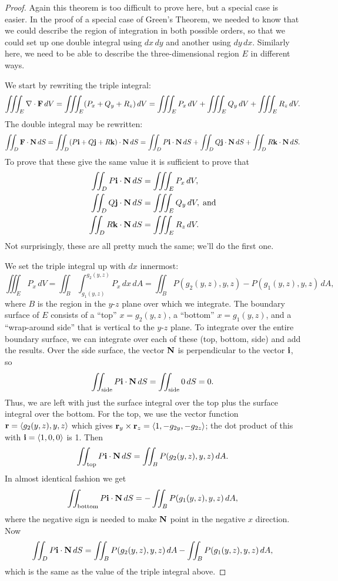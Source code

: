 \begin{proof}
Again this theorem is too difficult to prove here, but a special case
is easier. In the proof of a special case of Green's Theorem, we
needed to know that we could describe the region of integration in
both possible orders, so that we could set up one double integral
using $dx\,dy$ and another using $dy\,dx$. Similarly here, we need to
be able to describe the three-dimensional region $E$ in different
ways.

We start by rewriting the triple integral:
$$\iiint_{E} \nabla\cdot{\bf
  F}\,dV = \iiint_{E} (P_x+Q_y+R_z)\,dV
=\iiint_{E} P_x\,dV + \iiint_{E} Q_y\,dV + \iiint_{E} R_z\,dV.$$
The double integral may be rewritten:
$$\iint_{D} {\bf F}\cdot{\bf N}\,dS
=\iint_{D} (P{\bf i}+Q{\bf j}+R{\bf k})\cdot{\bf N}\,dS
=\iint_{D} P{\bf i}\cdot{\bf N}\,dS+\iint_{D} Q{\bf j}\cdot{\bf N}\,dS+
\iint_{D} R{\bf k}\cdot{\bf N}\,dS.$$
To prove that these give the same value it is sufficient to prove that
\begin{align}\label{eq:divergence proof}
\iint_{D} P{\bf i}\cdot{\bf N}\,dS&=\iiint_{E} P_x\,dV,	\\
\iint_{D} Q{\bf j}\cdot{\bf N}\,dS&=\iiint_{E} Q_y\,dV,\;\hbox{and}	\\
\iint_{D} R{\bf k}\cdot{\bf N}\,dS&=\iiint_{E} R_z\,dV.
\end{align}
Not surprisingly, these are all pretty much the same; we'll do the
first one.

We set the triple integral up with $dx$ innermost:
$$\iiint_{E} P_x\,dV=\iint_{B}\int_{g_1(y,z)}^{g_2(y,z)} P_x\,dx\,dA=
\iint_{B} P(g_2(y,z),y,z)-P(g_1(y,z),y,z)\,dA,$$
where $B$ is the region in the $y$-$z$ plane over which we integrate.
The boundary surface of $E$ consists of a ``top'' $x=g_2(y,z)$, a
``bottom'' $x=g_1(y,z)$, and a ``wrap-around side'' that is vertical
to the $y$-$z$ plane. To integrate over the entire boundary surface,
we can integrate over each of these (top, bottom, side) and add the
results. Over the side surface, the vector $\bf N$ is perpendicular to
the vector $\bf i$, so
$$
\iint_{\hbox{\scriptsize side}} P{\bf i}\cdot{\bf N}\,dS = 
\iint_{\hbox{\scriptsize side}}
0\,dS=0.$$
Thus, we are left with just the surface integral over the top plus the
surface integral over the bottom. For the top, we use the vector
function
${\bf r}=\langle g_2(y,z),y,z\rangle$ which gives 
${\bf r}_y\times{\bf r}_z=\langle 1,-g_{2y},-g_{2z}\rangle$; the dot
product of this with ${\bf i}=\langle 1,0,0\rangle$ is 1. Then
$$
\iint_{\hbox{\scriptsize top}} P{\bf i}\cdot{\bf N}\,dS
=\iint_{B} P(g_2(y,z),y,z)\,dA.$$
In almost identical fashion we get
$$
\iint_{\hbox{\scriptsize bottom}} P{\bf i}\cdot{\bf N}\,dS
=-\iint_{B} P(g_1(y,z),y,z)\,dA,$$
where the negative sign is needed to make $\bf N$ point in the
negative $x$ direction. Now
$$\iint_{D} P{\bf i}\cdot{\bf N}\,dS
=\iint_{B} P(g_2(y,z),y,z)\,dA-\iint_{B}
    P(g_1(y,z),y,z)\,dA,$$ which is the same as the value of the
    triple integral above.
\end{proof}

